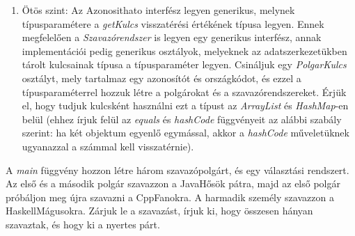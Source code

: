\documentclass[12pt,a4paper]{article}
\begin{document}
\begin{enumerate}
\item Ötös szint: Az Azonosithato interfész legyen generikus, melynek típusparamétere a \textit{getKulcs} visszatérési értékének típusa legyen. Ennek megfelelően a \textit{Szavazórendszer} is legyen egy generikus interfész, annak implementációi pedig generikus osztályok, melyeknek az adatszerkezetükben tárolt kulcsainak típusa a típusparaméter legyen. Csináljuk egy \textit{PolgarKulcs} osztályt, mely tartalmaz egy azonosítót és országkódot, és ezzel a típusparaméterrel hozzuk létre a polgárokat és a szavazórendszereket. Érjük el, hogy tudjuk kulcsként használni ezt a típust az \textit{ArrayList} és \textit{HashMap}-en belül (ehhez írjuk felül az \textit{equals} és \textit{hashCode} függvényeit az alábbi szabály szerint: ha két objektum egyenlő egymással, akkor a \textit{hashCode} műveletüknek ugyanazzal a számmal kell visszatérnie).

\end{enumerate}

A \textit{main} függvény hozzon létre három szavazópolgárt, és egy választási rendszert. Az első és a második polgár szavazzon a JavaHősök pátra, majd az első polgár próbáljon meg újra szavazni a CppFanokra. A harmadik személy szavazzon a HaskellMágusokra. Zárjuk le a szavazást, írjuk ki, hogy összesen hányan szavaztak, és hogy ki a nyertes párt.
\end{document}
